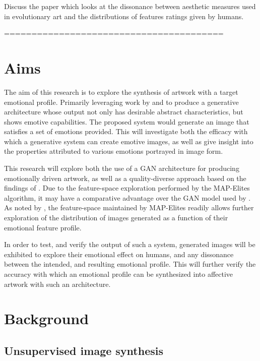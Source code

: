 \documentclass{article}
\begin{document}
	Discuss the paper \citet{johnson2019understanding} which looks at the dissonance between aesthetic measures used in evolutionary art and the distributions of features ratings given by humans.
	
	========================================
	
	\section{Aims}
	
	The aim of this research is to explore the synthesis of artwork with a target emotional profile.
	Primarily leveraging work by \citet{tan2017artgan} and \citet{kim2018building} to produce a generative architecture whose output not only has desirable abstract characteristics, but shows emotive capabilities.
	The proposed system would generate an image that satisfies a set of emotions provided.
	This will investigate both the efficacy with which a generative system can create emotive images, as well as give insight into the properties attributed to various emotions portrayed in image form.
	
	This research will explore both the use of a GAN architecture for producing emotionally driven artwork, as well as a quality-diverse approach based on the findings of \citet{nguyen2015innovation}.
	Due to the feature-space exploration performed by the MAP-Elites algorithm, it may have a comparative advantage over the GAN model used by \citet{tan2017artgan}.
	As noted by \citet{nguyen2015innovation}, the feature-space maintained by MAP-Elites readily allows further exploration of the distribution of images generated as a function of their emotional feature profile.
	
	In order to test, and verify the output of such a system, generated images will be exhibited to explore their emotional effect on humans, and any dissonance between the intended, and resulting emotional profile.
	This will further verify the accuracy with which an emotional profile can be synthesized into affective artwork with such an architecture.
	
	\section{Background}
	
	\subsection{Unsupervised image synthesis}
	
\end{document}

